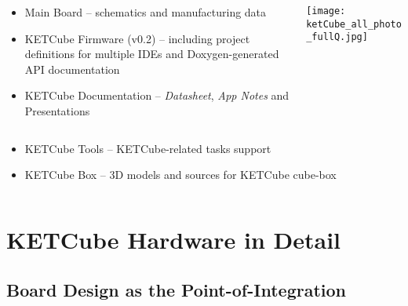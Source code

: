 \begin{frame}%
\centering
      \begin{columns}
      \begin{column}{0.6\paperwidth}
         
         \begin{itemize}
      \item Main Board -- schematics and manufacturing data
      \item KETCube Firmware (v0.2) -- including project definitions for multiple IDEs and Doxygen-generated API documentation
      \item KETCube Documentation -- {\it Datasheet}, {\it App Notes} and Presentations
         \end{itemize}
      \end{column}
      \begin{column}{0.4\paperwidth}
         \centering
         \texttt{[image: ketCube\_all\_photo\_fullQ.jpg]}
         \vfill
       \end{column}
    \end{columns}
  \vspace{-0.5cm}
  \flushleft
  \begin{columns}
      \begin{column}{0.95\paperwidth}
         \begin{itemize}
             \item KETCube Tools -- KETCube-related tasks support
             \item KETCube Box -- 3D models and sources for KETCube cube-box
         \end{itemize}
      \end{column}
      \begin{column}{0.05\paperwidth}
         \centering
         ~
       \end{column}
    \end{columns}
  
\end{frame}

\section{KETCube Hardware in Detail}
\subsection{Board Design as the Point-of-Integration}

